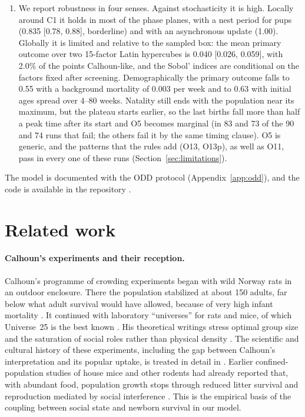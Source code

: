 \begin{enumerate}
  is not supported, because with the primary O11 the window has little or no effect on the boundary; and a
  predicted coexistence band (Q5) is refuted. Every deviation from the preregistered plan is listed in
  Table~\ref{tab:deviations}.
\item We report robustness in four senses. Against stochasticity it is high. Locally around \textsf{C1} it holds
  in most of the phase planes, with a nest period for pups (0.835 [0.78, 0.88], borderline) and with an
  asynchronous update (1.00). Globally it is limited and relative to the sampled box: the mean primary outcome over
  two 15-factor Latin hypercubes is 0.040 [0.026, 0.059], with 2.0\% of the points Calhoun-like, and the Sobol'
  indices are conditional on the factors fixed after screening. Demographically the primary outcome falls to 0.55
  with a background mortality of 0.003 per week and to 0.63 with initial ages spread over 4--80 weeks. Natality
  still ends with the population near its maximum, but the plateau starts earlier, so the last births fall more
  than half a peak time after its start and O5 becomes marginal (in 83 and 73 of the 90 and 74 runs that fail; the
  others fail it by the same timing clause). O5 is generic, and the patterns that the rules add (O13, O13p), as well as
  O11, pass in every one of these runs (Section~\ref{sec:limitations}).
\end{enumerate}
The model is documented with the ODD protocol \cite{Grimm2020} (Appendix~\ref{app:odd}), and the code is available in the repository \repourl.

\section{Related work}

\paragraph{Calhoun's experiments and their reception.}
Calhoun's programme of crowding experiments began with wild Norway rats in an outdoor enclosure.
There the population stabilized at about 150 adults, far below what adult survival would have allowed, because
of very high infant mortality \cite{Calhoun1962,Calhoun1963}.
It continued with laboratory ``universes'' for rats and mice, of which Universe~25 is the best known
\cite{Calhoun1973}.
His theoretical writings stress optimal group size and the saturation of social roles rather than physical density
\cite{Calhoun1971}.
The scientific and cultural history of these experiments, including the gap between Calhoun's interpretation and its
popular uptake, is treated in detail in \cite{RamsdenAdams2009,Ramsden2009,AdamsRamsden2024,Dugatkin2024}.
Earlier confined-population studies of house mice and other rodents had already reported that, with abundant food,
population growth stops through reduced litter survival and reproduction mediated by social interference
\cite{Southwick1955,Lidicker1965}.
This is the empirical basis of the coupling between social state and newborn survival in our model.

